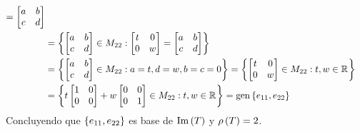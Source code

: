 \begin{solution}
\begin{enumerate}[a)]
\begin{align*}
{				=
				\begin{bmatrix}
					a & b\\
					c & d
				\end{bmatrix}
			}\\
			&=\set{
				\begin{bmatrix}
					a & b\\
					c & d
				\end{bmatrix}
				\in M_{22}:
				\begin{bmatrix}
					t & 0\\
					0 & w
				\end{bmatrix}
				=
				\begin{bmatrix}
					a & b\\
					c & d
				\end{bmatrix}
			}\\
			&=\set{
				\begin{bmatrix}
					a & b\\
					c & d
				\end{bmatrix}
				\in M_{22}: a = t, d = w, b = c = 0
			}
			=\set{
				\begin{bmatrix}
					t & 0\\
					0 & w
				\end{bmatrix}
				\in M_{22}: t, w\in\rmath
			}\\
			&=\set{
				t
				\begin{bmatrix}
					1 & 0\\
					0 & 0
				\end{bmatrix}
				+
				w
				\begin{bmatrix}
					0 & 0\\
					0 & 1
				\end{bmatrix}
				\in M_{22}: t, w\in\rmath
			} =\mgen[1]{\set{e_{11}, e_{22}}}
		\end{align*}
		Concluyendo que $\left\{ e_{11}, e_{22} \right\}$ es base de $\mim{T}$ y $\mrho{T} = 2$.
	\end{enumerate}
\end{solution}